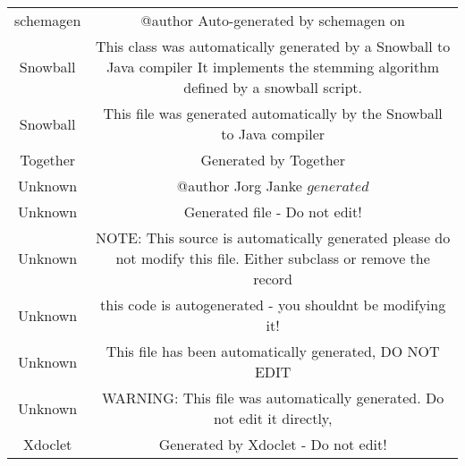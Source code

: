 \begin{table}
\begin{tabularx}{\textwidth}{c|C}
		schemagen & @author Auto-generated by schemagen on \timestamp \\
		Snowball & This class was automatically generated by a Snowball to Java compiler It implements the stemming algorithm defined by a snowball script. \\
		Snowball & This file was generated automatically by the Snowball to Java compiler \\
		Together & Generated by Together \\
		Unknown & @author Jorg Janke \(generated\) \\
		Unknown & Generated file - Do not edit! \\
		Unknown & NOTE: This source is automatically generated please do not modify this file.  Either subclass or remove the record \\
		Unknown & this code is autogenerated - you shouldnt be modifying it! \\
		Unknown & This file has been automatically generated, DO NOT EDIT \\
		Unknown & WARNING: This file was automatically generated. Do not edit it directly, \\
		Xdoclet & Generated by Xdoclet - Do not edit! \\		
	\end{tabularx}
\end{table}
\setlength{\extrarowheight}{0em}